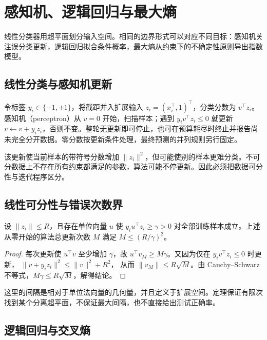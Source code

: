 \setcounter{chapter}{7} %
\chapter{感知机、逻辑回归与最大熵}
\label{chap:ml-logistic}

线性分类器用超平面划分输入空间。相同的边界形式可以对应不同目标：感知机关注误分类更新，逻辑回归拟合条件概率，最大熵从约束下的不确定性原则导出指数模型。

\section{线性分类与感知机更新}

令标签 $y_i\in\{-1,+1\}$，将截距并入扩展输入 $z_i=(x_i^\top,1)^\top$，分类分数为 $v^\top z_i$。感知机（perceptron）从 $v=0$ 开始，扫描样本；遇到 $y_iv^\top z_i\leq0$ 就更新 $v\leftarrow v+y_iz_i$，否则不变。整轮无更新即可停止，也可在预算耗尽时终止并报告尚未完全分开数据。零分数按更新条件处理，最终预测的并列规则另行固定。

该更新使当前样本的带符号分数增加 $\|z_i\|^2$，但可能使别的样本更难分类。不可分数据上不存在所有约束都满足的参数，算法可能不停更新。因此必须把数据可分性与迭代程序区分。

\section{线性可分性与错误次数界}

\begin{theorem}[感知机的有限更新]
设 $\|z_i\|\leq R$，且存在单位向量 $u$ 使 $y_iu^\top z_i\geq\gamma>0$ 对全部训练样本成立。上述从零开始的算法总更新次数 $M$ 满足 $M\leq(R/\gamma)^2$。
\end{theorem}
\begin{proof}
每次更新使 $u^\top v$ 至少增加 $\gamma$，故 $u^\top v_M\geq M\gamma$。又因为仅在 $y_iv^\top z_i\leq0$ 时更新，
$\|v+y_iz_i\|^2\leq\|v\|^2+R^2$，
从而 $\|v_M\|\leq R\sqrt M$。由 Cauchy--Schwarz 不等式，$M\gamma\leq R\sqrt M$，解得结论。
\end{proof}

这里的间隔是相对于单位法向量的几何量，并且定义于扩展空间。定理保证有限次找到某个分离超平面，不保证最大间隔，也不直接给出测试正确率。

\section{逻辑回归与交叉熵}

